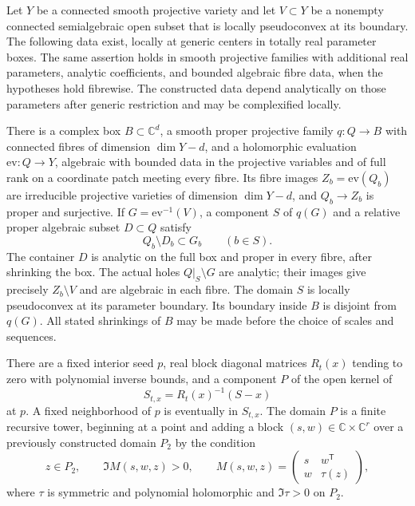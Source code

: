 \begin{theorem}\label{thm:win-construction}
Let $Y$ be a connected smooth projective variety and let $V\subset Y$ be a nonempty connected semialgebraic open subset that is locally pseudoconvex at its boundary.  The following data exist, locally at generic centers in totally real parameter boxes.  The same assertion holds in smooth projective families with additional real parameters, analytic coefficients, and bounded algebraic fibre data, when the hypotheses hold fibrewise.  The constructed data depend analytically on those parameters after generic restriction and may be complexified locally.

There is a complex box $B\subset\mathbb{C}^d$, a smooth proper projective family $q:Q\to B$ with connected fibres of dimension $\dim Y-d$, and a holomorphic evaluation $\mathrm{ev}:Q\to Y$, algebraic with bounded data in the projective variables and of full rank on a coordinate patch meeting every fibre.  Its fibre images $Z_b=\mathrm{ev}(Q_b)$ are irreducible projective varieties of dimension $\dim Y-d$, and $Q_b\to Z_b$ is proper and surjective. If $G=\mathrm{ev}^{-1}(V)$, a component $S$ of $q(G)$ and a relative proper algebraic subset $D\subset Q$ satisfy
\begin{equation}\label{eq:win-container}
               Q_b\setminus D_b\subset G_b\qquad(b\in S).
\end{equation}
The container $D$ is analytic on the full box and proper in every fibre, after shrinking the box.  The actual holes $Q|_S\setminus G$ are analytic; their images give precisely $Z_b\setminus V$ and are algebraic in each fibre.  The domain $S$ is locally pseudoconvex at its parameter boundary.  Its boundary inside $B$ is disjoint from $q(G)$.  All stated shrinkings of $B$ may be made before the choice of scales and sequences.

There are a fixed interior seed $p$, real block diagonal matrices $R_t(x)$ tending to zero with polynomial inverse bounds, and a component $P$ of the open kernel of
\[
                       S_{t,x}=R_t(x)^{-1}(S-x)
\]
at $p$.  A fixed neighborhood of $p$ is eventually in $S_{t,x}$. The domain $P$ is a finite recursive tower, beginning at a point and adding a block $(s,w)\in\mathbb{C}\times\mathbb{C}^r$ over a previously constructed domain $P_2$ by the condition
\begin{equation}\label{eq:win-tower}
      z\in P_2,\qquad
      \Im M(s,w,z)>0,\qquad
      M(s,w,z)=\begin{pmatrix}s&w^{\mathsf T}\\w&\tau(z)\end{pmatrix},
\end{equation}
where $\tau$ is symmetric and polynomial holomorphic and $\Im\tau>0$ on $P_2$.


\end{theorem}
